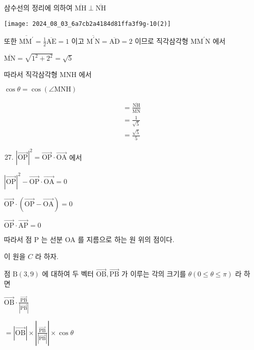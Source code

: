 \documentclass[10pt]{article}
\begin{document}
삼수선의 정리에 의하여 \(\overline{\mathrm{MH}} \perp \overline{\mathrm{NH}}\)

\begin{center}
\texttt{[image: 2024\_08\_03\_6a7cb2a4184d81ffa3f9g-10(2)]}
\end{center}

또한 \(\overline{\mathrm{MM}^{\prime}}=\frac{1}{2} \overline{\mathrm{AE}}=1\) 이고 \(\overline{\mathrm{M}^{\prime} \mathrm{N}}=\overline{\mathrm{AD}}=2\) 이므로 직각삼각형 \(\mathrm{MM}^{\prime} \mathrm{N}\) 에서

\(\overline{\mathrm{MN}}=\sqrt{1^{2}+2^{2}}=\sqrt{5}\)

따라서 직각삼각형 MNH 에서

\(\cos \theta=\cos (\angle \mathrm{MNH})\)

\[
\begin{aligned}
& =\frac{\overline{\mathrm{NH}}}{\overline{\mathrm{MN}}} \\
& =\frac{1}{\sqrt{5}} \\
& =\frac{\sqrt{5}}{5}
\end{aligned}
\]

\begin{enumerate}
  \setcounter{enumi}{26}
  \item \(|\overrightarrow{\mathrm{OP}}|^{2}=\overrightarrow{\mathrm{OP}} \cdot \overrightarrow{\mathrm{OA}}\) 에서
\end{enumerate}

\(|\overrightarrow{\mathrm{OP}}|^{2}-\overrightarrow{\mathrm{OP}} \cdot \overrightarrow{\mathrm{OA}}=0\)

\(\overrightarrow{\mathrm{OP}} \cdot(\overrightarrow{\mathrm{OP}}-\overrightarrow{\mathrm{OA}})=0\)

\(\overrightarrow{\mathrm{OP}} \cdot \overrightarrow{\mathrm{AP}}=0\)

따라서 점 P 는 선분 OA 를 지름으로 하는 원 위의 점이다.

이 원을 \(C\) 라 하자.

점 \(\mathrm{B}(3,9)\) 에 대하여 두 벡터 \(\overrightarrow{\mathrm{OB}}, \overrightarrow{\mathrm{PB}}\) 가 이루는 각의 크기를 \(\theta(0 \leq \theta \leq \pi)\) 라 하면

\(\overrightarrow{\mathrm{OB}} \cdot \frac{\overrightarrow{\mathrm{PB}}}{|\overrightarrow{\mathrm{PB}}|}\)

\(=|\overrightarrow{\mathrm{OB}}| \times\left|\frac{\overrightarrow{\mathrm{PB}}}{|\overrightarrow{\mathrm{PB}}|}\right| \times \cos \theta\)
\end{document}
